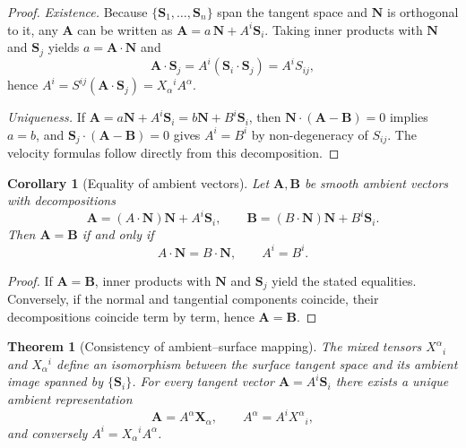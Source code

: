 \documentclass[11pt]{article}
\theoremstyle{definition}
\theoremstyle{plain}
\newtheorem{theorem}[definition]{Theorem}
\newtheorem{corollary}[definition]{Corollary}
\theoremstyle{remark}
\begin{document}
\begin{proof}
\emph{Existence.}
Because $\{\mathbf{S}_1,\ldots,\mathbf{S}_n\}$ span the tangent space and $\mathbf{N}$ is orthogonal to it, any $\mathbf{A}$ can be written as $\mathbf{A}=a\,\mathbf{N}+A^{i}\mathbf{S}_i$.
Taking inner products with $\mathbf{N}$ and $\mathbf{S}_j$ yields $a=\mathbf{A}\!\cdot\!\mathbf{N}$ and
\[
\mathbf{A}\!\cdot\!\mathbf{S}_j=A^{i}(\mathbf{S}_i\!\cdot\!\mathbf{S}_j)=A^{i}S_{ij},
\]
hence $A^{i}=S^{ij}(\mathbf{A}\!\cdot\!\mathbf{S}_j)=X_{\alpha}{}^{i}A^{\alpha}$.

\emph{Uniqueness.}
If $\mathbf{A}=a\mathbf{N}+A^{i}\mathbf{S}_i=b\mathbf{N}+B^{i}\mathbf{S}_i$, then 
$\mathbf{N}\cdot (\mathbf{A}-\mathbf{B})=0$ implies $a=b$, and 
$\mathbf{S}_j \cdot (\mathbf{A}-\mathbf{B})=0$ gives $A^{i}=B^{i}$ by non-degeneracy of $S_{ij}$.  
The velocity formulas follow directly from this decomposition.
\end{proof}

\begin{corollary}[Equality of ambient vectors]\label{cor:ambient-equality}
Let $\mathbf{A},\mathbf{B}$ be smooth ambient vectors with decompositions
\[
\mathbf{A}=(A \cdot \mathbf{N}) \mathbf{N}+A^{i}\mathbf{S}_i,
\qquad
\mathbf{B}=(B \cdot \mathbf{N}) \mathbf{N}+B^{i}\mathbf{S}_i.
\]
Then $\mathbf{A}=\mathbf{B}$ if and only if
\begin{equation}
A \cdot \mathbf{N}=B \cdot \mathbf{N},\qquad
A^{i}=B^{i}.
\end{equation}
\end{corollary}

\begin{proof}
If $\mathbf{A}=\mathbf{B}$, inner products with $\mathbf{N}$ and $\mathbf{S}_j$ yield the stated equalities.
Conversely, if the normal and tangential components coincide, their decompositions coincide term by term, hence $\mathbf{A}=\mathbf{B}$.
\end{proof}

\begin{theorem}[Consistency of ambient–surface mapping]\label{thm:ambient-surface-map}
The mixed tensors $X^{\alpha}{}_{i}$ and $X_{\alpha}{}^{i}$ define an isomorphism between the surface tangent space and its ambient image spanned by $\{\mathbf{S}_i\}$.
For every tangent vector $\mathbf{A}=A^{i}\mathbf{S}_i$ there exists a unique ambient representation
\[
\mathbf{A}=A^{\alpha}\mathbf{X}_{\alpha},\qquad
A^{\alpha}=A^{i}X^{\alpha}{}_{i},
\]
and conversely $A^{i}=X_{\alpha}{}^{i}A^{\alpha}$.
\end{theorem}
\end{document}
